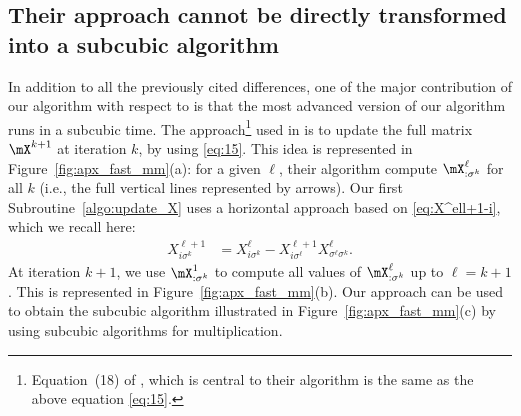 \subsection{Their approach cannot be directly transformed into a subcubic algorithm}
\label{apx:eq_15}

In addition to all the previously cited differences, one of the major contribution of our algorithm with respect to \cite{akbarzadeh2020conditions,nino2020fast} is that the most advanced version of our algorithm runs in a subcubic time. The approach\footnote{Equation~(18) of \cite{akbarzadeh2020conditions}, which is central to their algorithm is the same as the above equation \eqref{eq:15}.} used  in \cite{akbarzadeh2020conditions,nino2020fast} is to update the full matrix $\mX^{k+1}$ at iteration $k$, by using \eqref{eq:15}.  This idea is represented in Figure~\ref{fig:apx_fast_mm}(a): for a given $\ell$, their algorithm compute $\mX^\ell_{:\sigma^k}$ for all $k$ (i.e., the full vertical lines represented by arrows).  Our first Subroutine~\ref{algo:update_X} uses a horizontal approach based on \eqref{eq:X^ell+1-i}, which we recall here:
\begin{align*}
    X^{\ell+1}_{i\sigma^k} &= X^{\ell}_{i\sigma^k} -X^{\ell+1}_{i\sigma^\ell} X^{\ell}_{{\sigma^\ell} \sigma^k}.
\end{align*}
At iteration $k+1$, we use $\mX^{1}_{: \sigma^k}$ to compute all values of $\mX^\ell_{:\sigma^k}$ up to $\ell=k+1$.  This is represented in Figure~\ref{fig:apx_fast_mm}(b).  Our approach can be used to obtain the subcubic algorithm illustrated in Figure~\ref{fig:apx_fast_mm}(c) by using subcubic algorithms for multiplication.


